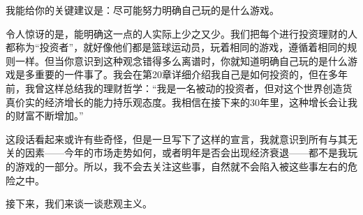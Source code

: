 我能给你的关键建议是：尽可能努力明确自己玩的是什么游戏。

令人惊讶的是，能明确这一点的人实际上少之又少。我们把每个进行投资理财的人都称为“投资者”，就好像他们都是篮球运动员，玩着相同的游戏，遵循着相同的规则一样。但当你意识到这种观念错得多么离谱时，你就知道明确自己玩的是什么游戏是多重要的一件事了。我会在第20章详细介绍我自己是如何投资的，但在多年前，我曾这样总结我的理财哲学：“我是一名被动的投资者，但对这个世界创造货真价实的经济增长的能力持乐观态度。我相信在接下来的30年里，这种增长会让我的财富不断增加。”

这段话看起来或许有些奇怪，但是一旦写下了这样的宣言，我就意识到所有与其无关的因素——今年的市场走势如何，或者明年是否会出现经济衰退——都不是我玩的游戏的一部分。所以，我不会去关注这些事，自然就不会陷入被这些事左右的危险之中。

接下来，我们来谈一谈悲观主义。
